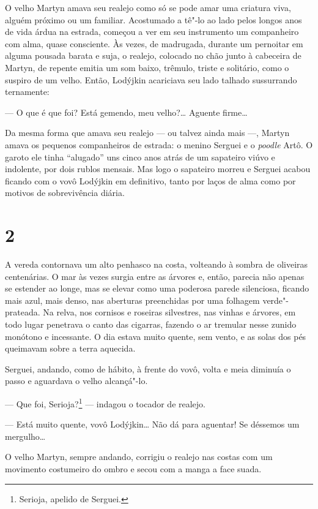 O velho Martyn amava seu realejo como só se pode amar uma criatura viva,
alguém próximo ou um familiar. Acostumado a tê"-lo ao lado pelos longos
anos de vida árdua na estrada, começou a ver em seu instrumento um
companheiro com alma, quase consciente. Às vezes, de madrugada, durante
um pernoitar em alguma pousada barata e suja, o realejo, colocado no
chão junto à cabeceira de Martyn, de repente emitia um som baixo,
trêmulo, triste e solitário, como o suspiro de um velho. Então, Lodýjkin
acariciava seu lado talhado sussurrando ternamente:

--- O que é que foi? Está gemendo, meu velho?\ldots{} Aguente firme\ldots{}

Da mesma forma que amava seu realejo --- ou talvez ainda mais ---,
Martyn amava os pequenos companheiros de estrada: o menino Serguei e o
\emph{poodle} Artô. O garoto ele tinha ``alugado'' uns cinco anos atrás
de um sapateiro viúvo e indolente, por dois rublos mensais. Mas logo o
sapateiro morreu e Serguei acabou ficando com o vovô Lodýjkin em
definitivo, tanto por laços de alma como por motivos de sobrevivência
diária.

\section{2}

A vereda contornava um alto penhasco na costa, volteando à sombra de
oliveiras centenárias. O mar às vezes surgia entre as árvores e, então,
parecia não apenas se estender ao longe, mas se elevar como uma poderosa
parede silenciosa, ficando mais azul, mais denso, nas aberturas
preenchidas por uma folhagem verde"-prateada. Na relva, nos cornisos e roseiras silvestres, nas vinhas e árvores, em todo lugar
penetrava o canto das cigarras, fazendo o ar tremular nesse zunido
monótono e incessante. O dia estava muito quente, sem vento, e as solas
dos pés queimavam sobre a terra aquecida.

Serguei, andando, como de hábito, à frente do vovô, volta e meia
diminuía o passo e aguardava o velho alcançá"-lo.

--- Que foi, Serioja?\footnote{Serioja, apelido de Serguei.} --- indagou
o tocador de realejo.

--- Está muito quente, vovô Lodýjkin\ldots{} Não dá para aguentar! Se
déssemos um mergulho\ldots{}

O velho Martyn, sempre andando, corrigiu o realejo nas costas com um
movimento costumeiro do ombro e secou com a manga a face suada.

